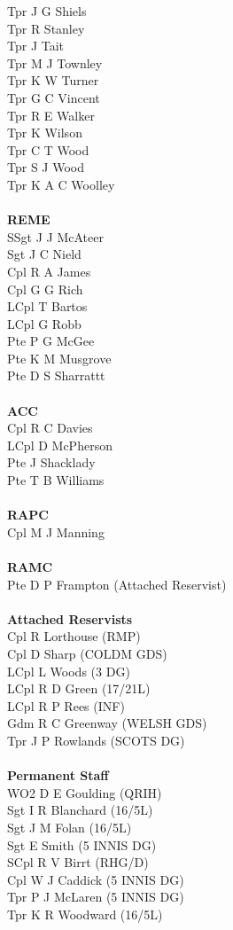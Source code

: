 \begin{multicols}{2}
  Tpr J G Shiels \\
  Tpr R Stanley \\
  Tpr J Tait \\
  Tpr M J Townley \\
  Tpr K W Turner \\
  Tpr G C Vincent \\
  Tpr R E Walker \\
  Tpr K Wilson \\
  Tpr C T Wood \\
  Tpr S J Wood \\
  Tpr K A C Woolley \\
  \\
  \textbf{REME} \\
  SSgt J J McAteer \\
  Sgt J C Nield \\
  Cpl R A James \\
  Cpl G G Rich \\
  LCpl T Bartos \\
  LCpl G Robb \\
  Pte P G McGee \\
  Pte K M Musgrove \\
  Pte D S Sharrattt \\
  \\
  \textbf{ACC} \\
  Cpl R C Davies \\
  LCpl D McPherson \\
  Pte J Shacklady \\
  Pte T B Williams \\
  \\
  \textbf{RAPC} \\
  Cpl M J Manning \\
  \\
  \textbf{RAMC} \\
  Pte D P Frampton (Attached Reservist) \\
  \\
  \textbf{Attached Reservists} \\
  Cpl R Lorthouse (RMP) \\
  Cpl D Sharp (COLDM GDS) \\
  LCpl L Woods (3 DG) \\
  LCpl R D Green (17/21L) \\
  LCpl R P Rees (INF) \\
  Gdm R C Greenway (WELSH GDS) \\
  Tpr J P Rowlands (SCOTS DG) \\
  \\
  \textbf{Permanent Staff} \\
  WO2 D E Goulding (QRIH) \\
  Sgt I R Blanchard (16/5L) \\
  Sgt J M Folan (16/5L) \\
  Sgt E Smith (5 INNIS DG) \\
  SCpl R V Birrt (RHG/D) \\
  Cpl W J Caddick (5 INNIS DG) \\
  Tpr P J McLaren (5 INNIS DG) \\
  Tpr K R Woodward (16/5L) \\
\end{multicols}
